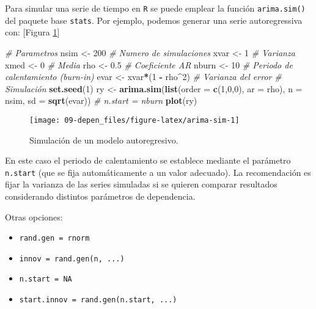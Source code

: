 \documentclass[
]{book}
\newenvironment{Shaded}{\begin{snugshade}}{\end{snugshade}}
\newcommand{\CommentTok}[1]{\textcolor[rgb]{0.56,0.35,0.01}{\textit{#1}}}
\newcommand{\DataTypeTok}[1]{\textcolor[rgb]{0.13,0.29,0.53}{#1}}
\newcommand{\DecValTok}[1]{\textcolor[rgb]{0.00,0.00,0.81}{#1}}
\newcommand{\FloatTok}[1]{\textcolor[rgb]{0.00,0.00,0.81}{#1}}
\newcommand{\KeywordTok}[1]{\textcolor[rgb]{0.13,0.29,0.53}{\textbf{#1}}}
\newcommand{\NormalTok}[1]{#1}
\newcommand{\OperatorTok}[1]{\textcolor[rgb]{0.81,0.36,0.00}{\textbf{#1}}}
\newcommand{\StringTok}[1]{\textcolor[rgb]{0.31,0.60,0.02}{#1}}
\theoremstyle{definition}
\theoremstyle{definition}
\theoremstyle{definition}
\theoremstyle{remark}
\begin{document}
Para simular una serie de tiempo en \texttt{R}
se puede emplear la función \texttt{arima.sim()} del paquete base \texttt{stats}.
Por ejemplo, podemos generar una serie autoregressiva con:
{[}Figura \ref{fig:arima-sim}{]}

\begin{Shaded}
\begin{Highlighting}[]
\CommentTok{# Parametros}
\NormalTok{nsim <-}\StringTok{ }\DecValTok{200}   \CommentTok{# Numero de simulaciones}
\NormalTok{xvar <-}\StringTok{ }\DecValTok{1}     \CommentTok{# Varianza}
\NormalTok{xmed <-}\StringTok{ }\DecValTok{0}     \CommentTok{# Media}
\NormalTok{rho <-}\StringTok{ }\FloatTok{0.5}    \CommentTok{# Coeficiente AR}
\NormalTok{nburn <-}\StringTok{ }\DecValTok{10}   \CommentTok{# Periodo de calentamiento (burn-in)}
\NormalTok{evar <-}\StringTok{ }\NormalTok{xvar}\OperatorTok{*}\NormalTok{(}\DecValTok{1} \OperatorTok{-}\StringTok{ }\NormalTok{rho}\OperatorTok{^}\DecValTok{2}\NormalTok{) }\CommentTok{# Varianza del error}
\CommentTok{# Simulación}
\KeywordTok{set.seed}\NormalTok{(}\DecValTok{1}\NormalTok{)}
\NormalTok{ry <-}\StringTok{ }\KeywordTok{arima.sim}\NormalTok{(}\KeywordTok{list}\NormalTok{(}\DataTypeTok{order =} \KeywordTok{c}\NormalTok{(}\DecValTok{1}\NormalTok{,}\DecValTok{0}\NormalTok{,}\DecValTok{0}\NormalTok{), }\DataTypeTok{ar =}\NormalTok{ rho), }
            \DataTypeTok{n =}\NormalTok{ nsim, }\DataTypeTok{sd =} \KeywordTok{sqrt}\NormalTok{(evar)) }\CommentTok{# n.start = nburn}
\KeywordTok{plot}\NormalTok{(ry)}
\end{Highlighting}
\end{Shaded}

\begin{figure}[!htb]

{\centering \texttt{[image: 09-depen\_files/figure-latex/arima-sim-1]} 

}

\caption{Simulación de un modelo autoregresivo.}\label{fig:arima-sim}
\end{figure}

En este caso el periodo de calentamiento se establece mediante el
parámetro \texttt{n.start} (que se fija automáticamente a un valor adecuado).
La recomendación es fijar la varianza de las series simuladas si se quieren
comparar resultados considerando distintos parámetros de dependencia.

Otras opciones:

\begin{itemize}
\item
  \texttt{rand.gen\ =\ rnorm}
\item
  \texttt{innov\ =\ rand.gen(n,\ ...)}
\item
  \texttt{n.start\ =\ NA}
\item
  \texttt{start.innov\ =\ rand.gen(n.start,\ ...)}
\end{itemize}
\end{document}
